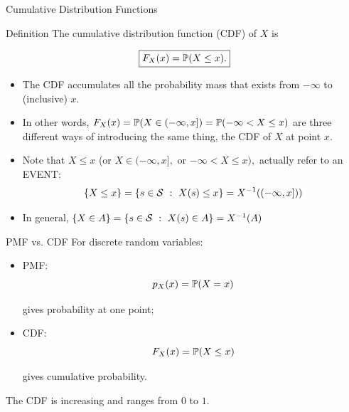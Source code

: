 \begin{frame}{Cumulative Distribution Functions}
\begin{keybox}{Definition}
The cumulative distribution function (CDF) of $X$ is

\[
\boxed{
F_X(x)=\mathbb{P}(X\leq x) .
}
\]
\end{keybox}

\vspace{0.25cm}

\begin{itemize}
    \item The CDF accumulates all the probability mass that exists from $-\infty$ to (inclusive) $x$. 

\item In other words, $F_X(x) = \mathbb{P}(X \in (-\infty, x]) = \mathbb{P}(-\infty < X\leq x)$ are three different ways of introducing the same thing, the CDF of $X$ at point $x$.

\item Note that $X\leq x$ (or $X\in (- \infty, x],$ or $-\infty < X\leq x),$  actually refer to an EVENT:
\begin{equation*}
    \{X\leq x\} = \{ s \in \mathcal{S} \ : \ X(s)\leq x  \}  = X^{-1}((-\infty , x]))
\end{equation*}

\item In general, $\{X \in A \} = \{ s\in \mathcal{S} \ : \ X(s) \in A \} = X^{-1}(A)$
    
\end{itemize}
\end{frame}

\begin{frame}{PMF vs. CDF}
For discrete random variables:

\vspace{0.25cm}

\begin{itemize}
    \item PMF:
    \[
    p_X(x) = \mathbb{P}(X=x)
    \]

    gives probability at one point;

    \item CDF:
    \[
   F_X(x) =  \mathbb{P}(X\leq x)
    \]

    gives cumulative probability.
\end{itemize}

\vspace{0.25cm}

The CDF is increasing and ranges from $0$ to $1$.
\end{frame}



